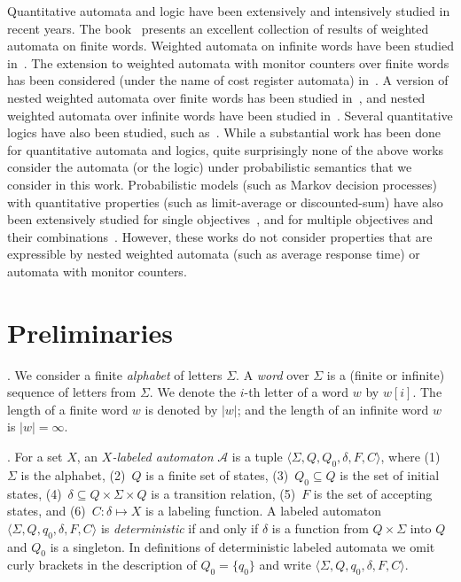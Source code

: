 \documentclass{lmcs}
\newcommand{\Paragraph}[1]{\noindent{\textbf{#1}}}
\newcommand{\cost}{{C}}
\newcommand{\tuple}[1]{\langle#1\rangle}
\newcommand{\aut}{\mathcal{A}}
\begin{document}
\smallskip{}
Quantitative automata and logic have been extensively and intensively
studied in recent years.
The book~\cite{Droste:2009:HWA:1667106} presents an excellent collection of results
of weighted automata on finite words.
Weighted automata on infinite words have been studied in~\cite{Chatterjee08quantitativelanguages,DBLP:journals/corr/abs-1007-4018,DrosteR06}.
The extension to weighted automata with monitor counters over finite words has been considered (under the name of
cost register automata) in~\cite{DBLP:conf/lics/AlurDDRY13}.
A version of nested weighted automata over finite words has been
studied in~\cite{bollig2010pebble}, and nested weighted automata over
infinite words have been studied in~\cite{nested}.
Several quantitative logics have also been studied, such as~\cite{BokerCHK14,BouyerMM14,AlmagorBK14}.
While a substantial work has been done for quantitative automata and logics, quite surprisingly
none of the above works consider the automata (or the logic) under probabilistic semantics that
we consider in this work.
Probabilistic models (such as Markov decision processes) with quantitative properties
(such as limit-average or discounted-sum) have also been extensively studied for
single objectives~\cite{filar,Puterman}, and for multiple objectives and their
combinations~\cite{CMH06,Cha07,CFW13,BBCFK11,CKK15,Forejt,FKN11,CD11,Baier-CSL-LICS-1,Baier-CSL-LICS-2}.
However, these works do not consider properties that are expressible by nested weighted
automata (such as average response time) or automata with monitor counters.








\section{Preliminaries}
\Paragraph{Words}.
We consider a finite \emph{alphabet} of letters $\Sigma$.
A \emph{word} over $\Sigma$ is a (finite or infinite) sequence of letters from $\Sigma$.
We denote the $i$-th letter of a word $w$ by $w[i]$.
The length of a finite word $w$ is denoted by $|w|$; and the length of an infinite word
$w$ is $|w| = \infty$.

\smallskip
\Paragraph{Labeled automata}. For a set $X$, an \emph{$X$-labeled automaton} $\aut$ is a tuple
$\tuple{\Sigma, Q, Q_0, \delta, F, \cost}$, where
(1)~$\Sigma$ is the alphabet,
(2)~$Q$ is a finite set of states,
(3)~$Q_0 \subseteq Q$ is the set of initial states,
(4)~$\delta \subseteq Q \times \Sigma \times Q$ is a transition relation,
(5)~$F$ is the set of accepting states,
and
(6)~$\cost : \delta \mapsto X$ is a labeling function.
A labeled automaton $\tuple{\Sigma, Q, q_0, \delta, F, \cost}$ is
\emph{deterministic} if and only if
$\delta$ is a function from $Q \times \Sigma$ into $Q$
and $Q_0$ is a singleton.
In definitions of deterministic labeled automata we omit curly brackets in the description of $Q_0 = \{ q_0\}$
and write $\tuple{\Sigma, Q, q_0, \delta, F, \cost}$.
\end{document}
